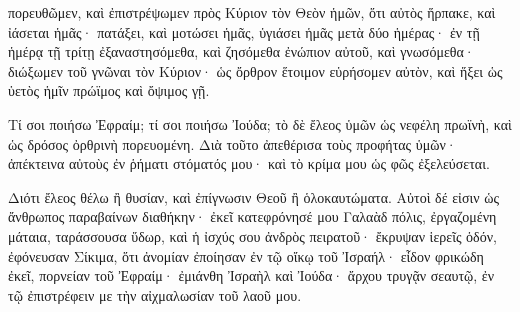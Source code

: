 {πορευθῶμεν, καὶ ἐπιστρέψωμεν πρὸς Κύριον τὸν Θεὸν ἡμῶν, ὅτι αὐτὸς ἥρπακε, καὶ ἰάσεται ἡμᾶς· πατάξει,
καὶ μοτώσει ἡμᾶς, ὑγιάσει ἡμᾶς μετὰ δύο ἡμέρας· ἐν τῇ ἡμέρᾳ τῇ τρίτῃ ἐξαναστησόμεθα,
καὶ ζησόμεθα ἐνώπιον αὐτοῦ, καὶ γνωσόμεθα· διώξωμεν τοῦ γνῶναι τὸν Κύριον· ὡς ὄρθρον ἕτοιμον εὑρήσομεν αὐτὸν, καὶ ἥξει ὡς ὑετὸς ἡμῖν πρώϊμος καὶ ὄψιμος γῇ.
\par }{\PP {}Τί σοι ποιήσω Ἐφραίμ; τί σοι ποιήσω Ἰούδα; τὸ δὲ ἔλεος ὑμῶν ὡς νεφέλη πρωϊνὴ, καὶ ὡς δρόσος ὀρθρινὴ πορευομένη.
Διὰ τοῦτο ἀπεθέρισα τοὺς προφήτας ὑμῶν· ἀπέκτεινα αὐτοὺς ἐν ῥήματι στόματός μου· καὶ τὸ κρίμα μου ὡς φῶς ἐξελεύσεται.
\par }{\PP {}Διότι ἔλεος θέλω ἢ θυσίαν, καὶ ἐπίγνωσιν Θεοῦ ἢ ὁλοκαυτώματα.
Αὐτοὶ δέ εἰσιν ὡς ἄνθρωπος παραβαίνων διαθήκην· ἐκεῖ κατεφρόνησέ μου Γαλαὰδ πόλις,
ἐργαζομένη μάταια, ταράσσουσα ὕδωρ,
καὶ ἡ ἰσχύς σου ἀνδρὸς πειρατοῦ· ἔκρυψαν ἱερεῖς ὁδόν, ἐφόνευσαν Σίκιμα, ὅτι ἀνομίαν ἐποίησαν ἐν τῷ οἴκῳ τοῦ Ἰσραήλ· εἶδον φρικώδη ἐκεῖ,
πορνείαν τοῦ Ἐφραίμ· ἐμιάνθη Ἰσραὴλ καὶ Ἰούδα· ἄρχου τρυγᾷν σεαυτῷ,
ἐν τῷ ἐπιστρέφειν με τὴν αἰχμαλωσίαν τοῦ λαοῦ μου.

}
